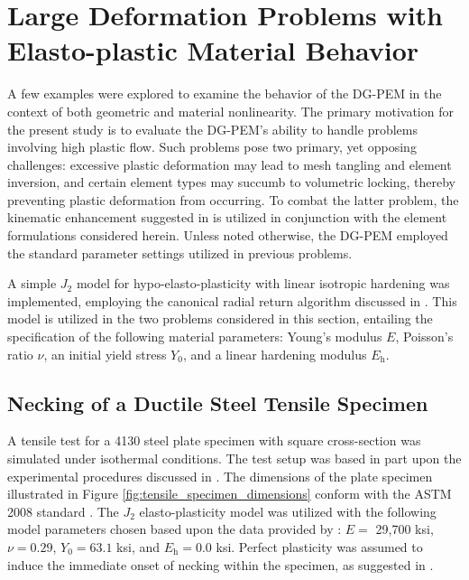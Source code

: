 

\section{Large Deformation Problems with Elasto-plastic Material Behavior}

A few examples were explored to examine the behavior of the DG-PEM in the context of both geometric and material nonlinearity. The primary motivation for the present study is to evaluate the DG-PEM's ability to handle problems involving high plastic flow. Such problems pose two primary, yet opposing challenges: excessive plastic deformation may lead to mesh tangling and element inversion, and certain element types may succumb to volumetric locking, thereby preventing plastic deformation from occurring. To combat the latter problem, the kinematic enhancement suggested in \cite{Rashid:06} is utilized in conjunction with the element formulations considered herein. Unless noted otherwise, the DG-PEM employed the standard parameter settings utilized in previous problems.

A simple $J_2$ model for hypo-elasto-plasticity with linear isotropic hardening was implemented, employing the canonical radial return algorithm discussed in \cite{LSDYNA}. This model is utilized in the two problems considered in this section, entailing the specification of the following material parameters: Young's modulus $E$, Poisson's ratio $\nu$, an initial yield stress $Y_0$, and a linear hardening modulus $E_{\mathrm h}$.

\subsection*{Necking of a Ductile Steel Tensile Specimen}

A tensile test for a 4130 steel plate specimen with square cross-section was simulated under isothermal conditions. The test setup was based in part upon the experimental procedures discussed in \cite{Gerberich:62}. The dimensions of the plate specimen illustrated in Figure \ref{fig:tensile_specimen_dimensions} conform with the ASTM 2008 standard \cite{ASTM:08}. The $J_2$ elasto-plasticity model was utilized with the following model parameters chosen based upon the data provided by \cite{ASM:18}: $E =$ 29,700 ksi, $\nu = 0.29$, $Y_0 = 63.1$ ksi, and $E_{\mathrm h} = 0.0$ ksi. Perfect plasticity was assumed to induce the immediate onset of necking within the specimen, as suggested in \cite{Kim:05}.

